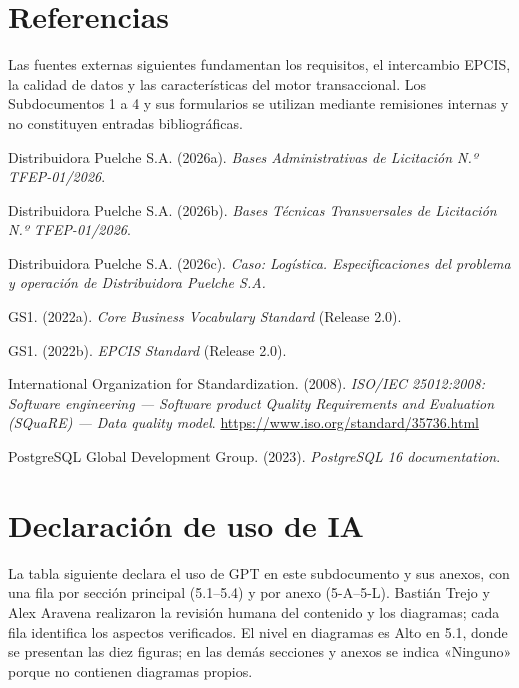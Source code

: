 \section*{Referencias}

Las fuentes externas siguientes fundamentan los requisitos, el intercambio EPCIS, la calidad de datos y las características del motor transaccional. Los Subdocumentos 1 a 4 y sus formularios se utilizan mediante remisiones internas y no constituyen entradas bibliográficas.

\begin{list}{}{\setlength{\leftmargin}{1.27cm}\setlength{\itemindent}{-1.27cm}\setlength{\itemsep}{3pt}\setlength{\parsep}{0pt}}
\item Distribuidora Puelche S.A. (2026a). \emph{Bases Administrativas de Licitación N.º TFEP-01/2026}.
\item Distribuidora Puelche S.A. (2026b). \emph{Bases Técnicas Transversales de Licitación N.º TFEP-01/2026}.
\item Distribuidora Puelche S.A. (2026c). \emph{Caso: Logística. Especificaciones del problema y operación de Distribuidora Puelche S.A.}
\item GS1. (2022a). \emph{Core Business Vocabulary Standard} (Release 2.0).
\item GS1. (2022b). \emph{EPCIS Standard} (Release 2.0).
\item International Organization for Standardization. (2008). \emph{ISO/IEC 25012:2008: Software engineering — Software product Quality Requirements and Evaluation (SQuaRE) — Data quality model}. \url{https://www.iso.org/standard/35736.html}
\item PostgreSQL Global Development Group. (2023). \emph{PostgreSQL 16 documentation}.
\end{list}

\section*{Declaración de uso de IA}

La tabla siguiente declara el uso de GPT en este subdocumento y sus anexos, con una fila por sección principal (5.1–5.4) y por anexo (5-A–5-L). Bastián Trejo y Alex Aravena realizaron la revisión humana del contenido y los diagramas; cada fila identifica los aspectos verificados. El nivel en diagramas es Alto en 5.1, donde se presentan las diez figuras; en las demás secciones y anexos se indica «Ninguno» porque no contienen diagramas propios.

